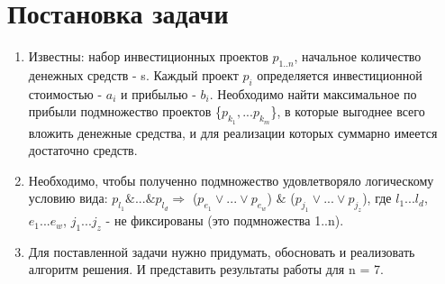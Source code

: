 \documentclass[a4paper,12pt]{article}
\begin{document}

\tableofcontents
\listoftables

\newpage

\section{Постановка задачи}
\begin{enumerate}
\item 
Известны: набор инвестиционных проектов $p_{1..n}$, начальное количество денежных средств - s. Каждый проект ${p_i}$ определяется инвестиционной стоимостью - 
${a_i}$ и прибылью - ${b_i}$. Необходимо найти максимальное по прибыли подмножество проектов \{${p_{k_1},...p_{k_m}}$\}, в которые выгоднее всего вложить денежные средства, и для реализации которых суммарно имеется достаточно средств.

\item
Необходимо, чтобы полученно подмножество удовлетворяло логическому условию вида:
\newline
${p_{l_1} \& ...\& p_{l_d}} \Rightarrow$ (${p_{e_1}\vee ... \vee p_{e_w}}$) $ \& $ (${p_{j_1}\vee ...\vee p_{j_z}}$),
\newline
где ${{l_1}...{l_d}}$, ${{e_1}...{e_w}}$, ${{j_1}...{j_z}}$ - не фиксированы (это подмножества {1..n}).  
\item
Для поставленной задачи нужно придумать, обосновать и реализовать алгоритм решения. И представить результаты работы для n = 7.

\end{enumerate}
\end{document}
